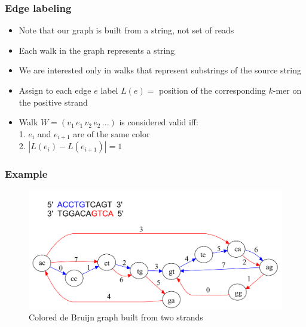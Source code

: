 \documentclass[svgnames,14pt]{beamer}
\begin{document}
\begin{frame}
\frametitle{Edge labeling}
\begin{itemize}
\item Note that our graph is built from a string, not set of reads
\item Each walk in the graph represents a string
\item We are interested only in walks that represent substrings of the source string
\item Assign to each edge \( e \) label \( L(e) = \) position of the corresponding  \(k\)-mer on the positive strand
\item Walk  \( W = ( v_{1} \, e_{1} \, v_{2} \, e_{2} \, ... ) \) is considered valid iff: \\
1. \( e_{i} \) and \( e_{i + 1} \) are of the same color \\
2. \( | L(e_{i}) - L(e_{i + 1}) | = 1 \)
\end{itemize}
\end{frame}

\begin{frame}
\frametitle{Example}
\begin{changemargin}{-1.cm}{-1.cm}
\begin{figure}
\centering
\includegraphics[scale = 0.480]{Figure1.pdf}
\small \caption{Colored de Bruijn graph built from two strands}
\end{figure}
\end{changemargin}
\end{frame}
\end{document}
